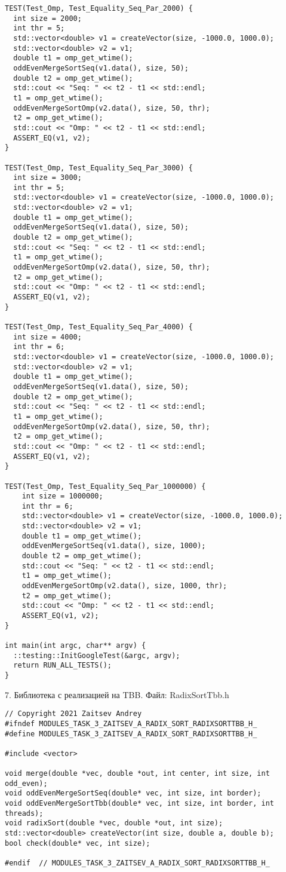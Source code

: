 \documentclass{report}
\begin{document}
\begin{lstlisting}
TEST(Test_Omp, Test_Equality_Seq_Par_2000) {
  int size = 2000;
  int thr = 5;
  std::vector<double> v1 = createVector(size, -1000.0, 1000.0);
  std::vector<double> v2 = v1;
  double t1 = omp_get_wtime();
  oddEvenMergeSortSeq(v1.data(), size, 50);
  double t2 = omp_get_wtime();
  std::cout << "Seq: " << t2 - t1 << std::endl;
  t1 = omp_get_wtime();
  oddEvenMergeSortOmp(v2.data(), size, 50, thr);
  t2 = omp_get_wtime();
  std::cout << "Omp: " << t2 - t1 << std::endl;
  ASSERT_EQ(v1, v2);
}

TEST(Test_Omp, Test_Equality_Seq_Par_3000) {
  int size = 3000;
  int thr = 5;
  std::vector<double> v1 = createVector(size, -1000.0, 1000.0);
  std::vector<double> v2 = v1;
  double t1 = omp_get_wtime();
  oddEvenMergeSortSeq(v1.data(), size, 50);
  double t2 = omp_get_wtime();
  std::cout << "Seq: " << t2 - t1 << std::endl;
  t1 = omp_get_wtime();
  oddEvenMergeSortOmp(v2.data(), size, 50, thr);
  t2 = omp_get_wtime();
  std::cout << "Omp: " << t2 - t1 << std::endl;
  ASSERT_EQ(v1, v2);
}

TEST(Test_Omp, Test_Equality_Seq_Par_4000) {
  int size = 4000;
  int thr = 6;
  std::vector<double> v1 = createVector(size, -1000.0, 1000.0);
  std::vector<double> v2 = v1;
  double t1 = omp_get_wtime();
  oddEvenMergeSortSeq(v1.data(), size, 50);
  double t2 = omp_get_wtime();
  std::cout << "Seq: " << t2 - t1 << std::endl;
  t1 = omp_get_wtime();
  oddEvenMergeSortOmp(v2.data(), size, 50, thr);
  t2 = omp_get_wtime();
  std::cout << "Omp: " << t2 - t1 << std::endl;
  ASSERT_EQ(v1, v2);
}

TEST(Test_Omp, Test_Equality_Seq_Par_1000000) {
	int size = 1000000;
	int thr = 6;
	std::vector<double> v1 = createVector(size, -1000.0, 1000.0);
	std::vector<double> v2 = v1;
	double t1 = omp_get_wtime();
	oddEvenMergeSortSeq(v1.data(), size, 1000);
	double t2 = omp_get_wtime();
	std::cout << "Seq: " << t2 - t1 << std::endl;
	t1 = omp_get_wtime();
	oddEvenMergeSortOmp(v2.data(), size, 1000, thr);
	t2 = omp_get_wtime();
	std::cout << "Omp: " << t2 - t1 << std::endl;
	ASSERT_EQ(v1, v2);
}

int main(int argc, char** argv) {
  ::testing::InitGoogleTest(&argc, argv);
  return RUN_ALL_TESTS();
}
\end{lstlisting}

\par 7. Библиотека с реализацией на TBB. Файл: RadixSortTbb.h
\begin{lstlisting}
// Copyright 2021 Zaitsev Andrey
#ifndef MODULES_TASK_3_ZAITSEV_A_RADIX_SORT_RADIXSORTTBB_H_
#define MODULES_TASK_3_ZAITSEV_A_RADIX_SORT_RADIXSORTTBB_H_

#include <vector>

void merge(double *vec, double *out, int center, int size, int odd_even);
void oddEvenMergeSortSeq(double* vec, int size, int border);
void oddEvenMergeSortTbb(double* vec, int size, int border, int threads);
void radixSort(double *vec, double *out, int size);
std::vector<double> createVector(int size, double a, double b);
bool check(double* vec, int size);

#endif  // MODULES_TASK_3_ZAITSEV_A_RADIX_SORT_RADIXSORTTBB_H_
\end{lstlisting}
\end{document}
